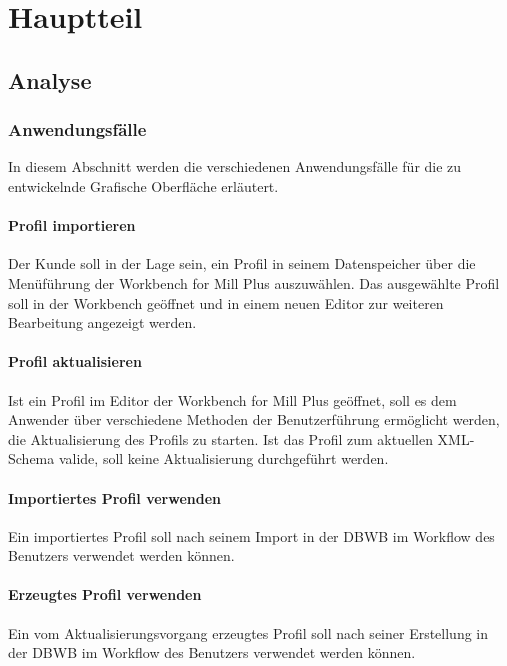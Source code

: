 
\chapter{Hauptteil}
\label{cha:Hauptteil}

\section{Analyse}{
\label{sec:analyse}
\subsection{Anwendungsfälle}{
In diesem Abschnitt werden die verschiedenen Anwendungsfälle für die zu entwickelnde Grafische Oberfläche erläutert.

\subsubsection{Profil importieren}{
Der Kunde soll in der Lage sein, ein Profil in seinem Datenspeicher über die Menüführung der Workbench for Mill Plus auszuwählen. Das ausgewählte Profil soll in der Workbench geöffnet und in einem neuen Editor zur weiteren Bearbeitung angezeigt werden.
}

\subsubsection{Profil aktualisieren}{
Ist ein Profil im Editor der Workbench for Mill Plus geöffnet, soll es dem Anwender über verschiedene Methoden der Benutzerführung ermöglicht werden, die Aktualisierung des Profils zu starten. Ist das Profil zum aktuellen XML-Schema valide, soll keine Aktualisierung durchgeführt werden.
}

\subsubsection{Importiertes Profil verwenden}{
Ein importiertes Profil soll nach seinem Import in der \ac{DBWB} im Workflow des Benutzers verwendet werden können. 
}

\subsubsection{Erzeugtes Profil verwenden}{
Ein vom Aktualisierungsvorgang erzeugtes Profil soll nach seiner Erstellung in der \ac{DBWB} im Workflow des Benutzers verwendet werden können. 
}



}}

